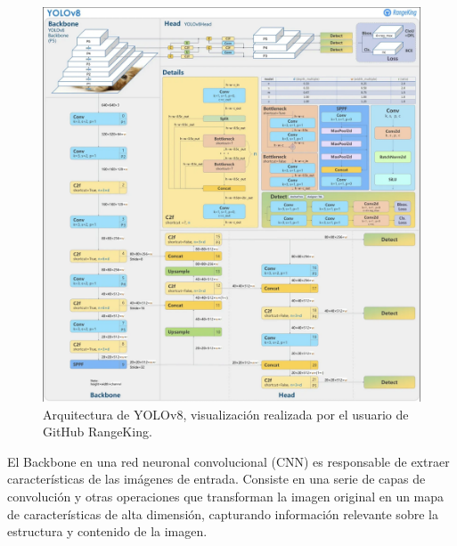 \begin{figure}
    \centering
    \includegraphics[width=1\textwidth]{../img/yolov8-arq.png}
    \caption{Arquitectura de YOLOv8, visualización realizada por el usuario de GitHub RangeKing\cite{RangeKing_GitHub}.}
    \label{fig:YOLOv8_architecture}
\end{figure}

El Backbone en una red neuronal convolucional (CNN) es responsable de extraer características de las imágenes de entrada. Consiste en una serie de capas de convolución y otras operaciones que transforman la imagen original en un mapa de características de alta dimensión, capturando información relevante sobre la estructura y contenido de la imagen.

